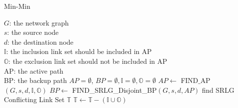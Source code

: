 \begin{algorithm}
\small{
\caption{Min-Min}
\begin{algorithmic}[1]
\label{alg:min-min}
\REQUIRE
$G$: the network graph\\
$s$: the source node\\
$d$: the destination node \\
$\mathbb{I}$:   the inclusion link set should be included in AP\\
$\mathbb{O}$: the exclusion link set should not be included in AP\\
\ENSURE
AP: the active path\\
BP: the backup path
\STATE $AP=\emptyset$, $BP=\emptyset, \mathbb{I}=\emptyset, \mathbb{O}=\emptyset$
\STATE $AP\leftarrow$ FIND$\_$AP$(G,s,d,\mathbb{I},\mathbb{O})$\label{alg:findap}
    \RETURN $BP\leftarrow$ FIND\_SRLG\_Disjoint\_BP$(G,s,d,AP)$\label{alg:findsrlgdisjointbp}
        \label{alg:returnpathpair}
    \ELSE
        \STATE find SRLG Conflicting Link Set $\mathbb{T}$\label{alg:findsrlgconflictinglinkset}
        \STATE $\mathbb{T}\leftarrow \mathbb{T}-(\mathbb{I}\cup\mathbb{O})$
        \label{alg:dividedandconquer}
        \label{alg:findfeasible}
        \ENDIF

    \ENDIF
\ENDIF
\end{algorithmic}
}
\end{algorithm}


